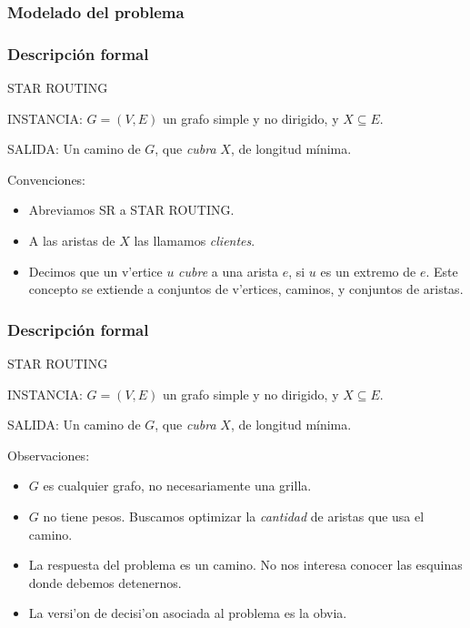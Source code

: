 \documentclass{beamer}
\newcommand{\probl}[1]{\textnormal{\textsf{#1}}}
\newcommand{\optpr}[3]{

\begin{list}{}{
\setlength{\leftmargin}{0.1in}
\setlength{\rightmargin}{0.1in}
\setlength{\parsep}{0pt}
\setlength{\itemsep}{2pt}
\setlength{\topsep}{\itemsep}
\setlength{\partopsep}{\itemsep}
}
\item
{\probl{#1}}
\item
{INSTANCIA: #2}
\item
{SALIDA: #3}
\end{list}
\vspace{1mm}
}
\begin{document}
\begin{frame}
\frametitle{Modelado del problema}
\vspace{5mm}
\begin{figure}
	\begin{center}
		
	\end{center}	
\end{figure}
\end{frame}

\begin{frame}
\frametitle{Descripci\'on formal}

\pause

\optpr{STAR ROUTING}{$G = (V, E)$ un grafo simple y no dirigido, y $X \subseteq E$.}{Un camino de $G$, que \textit{cubra} $X$, de longitud m\'inima.}

Convenciones:
\pause
\begin{itemize}
\item Abreviamos \probl{SR} a \probl{STAR ROUTING}.
\pause
\item A las aristas de $X$ las llamamos \textit{clientes}.
\pause
\item Decimos que un v'ertice $u$ \textit{cubre} a una arista $e$, si $u$ es un extremo de $e$. Este concepto se extiende a conjuntos de v'ertices, caminos, y conjuntos de aristas.
\end{itemize}

\end{frame}

\begin{frame}
\frametitle{Descripci\'on formal}

\optpr{STAR ROUTING}{$G = (V, E)$ un grafo simple y no dirigido, y $X \subseteq E$.}{Un camino de $G$, que \textit{cubra} $X$, de longitud m\'inima.}

Observaciones:
\pause
\begin{itemize}
\item $G$ es cualquier grafo, no necesariamente una grilla.
\pause
\item $G$ no tiene pesos. Buscamos optimizar la \emph{cantidad} de aristas que usa el camino.
\pause
\item La respuesta del problema es un camino. No nos interesa conocer las esquinas donde debemos detenernos.
\pause
\item La versi'on de decisi'on asociada al problema es la obvia.
\end{itemize}

\end{frame}
\end{document}
